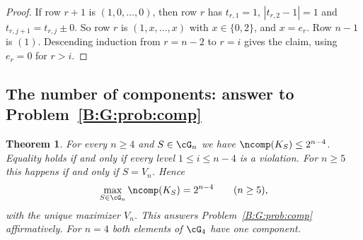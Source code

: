 \documentclass[11pt,a4paper]{article}
\newtheorem{theorem}{Theorem}[section]
\theoremstyle{definition}
\theoremstyle{remark}
\numberwithin{equation}{section}
\begin{document}
\begin{proof}
If row $r+1$ is $(1,0,\dots,0)$, then row $r$ has $t_{r,1}=1$, $|t_{r,2}-1|=1$ and
$t_{r,j+1}=t_{r,j}\pm0$. So row $r$ is $(1,x,\dots,x)$ with $x\in\{0,2\}$, and $x=e_r$. Row
$n-1$ is $(1)$. Descending induction from $r=n-2$ to $r=i$ gives the claim, using $e_r=0$ for
$r>i$.
\end{proof}

\subsection{The number of components: answer to Problem~\ref{B:G:prob:comp}}\label{B:G:sub:comp}

\begin{theorem}\label{B:G:thm:comp}
For every $n\ge4$ and $S\in\cG_n$ we have $\ncomp(K_S)\le2^{n-4}$. Equality holds if and only if
every level $1\le i\le n-4$ is a violation. For $n\ge5$ this happens if and only if $S=V_n$.
Hence
\[
 \max_{S\in\cG_n}\ncomp(K_S)=2^{n-4}\qquad(n\ge5),
\]
with the unique maximizer $V_n$. This answers Problem~\ref{B:G:prob:comp} affirmatively. For
$n=4$ both elements of $\cG_4$ have one component.
\end{theorem}
\end{document}
